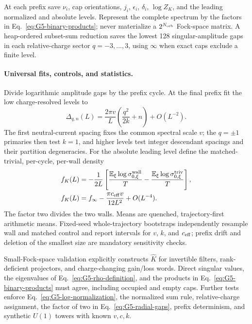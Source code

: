\documentclass[aps,prx,twocolumn,floatfix,nofootinbib,superscriptaddress,longbibliography]{revtex4-2}
\newcommand{\E}{\mathbb{E}}
\begin{document}
At each prefix save $\nu_i$, cap orientations, $j_i$, $\epsilon_i$, $\delta_i$,
$\log Z_K$, and the leading normalized and absolute levels.  Represent the complete
spectrum by the factors in Eq.~\eqref{eq:G5-binary-products}; never materialize a
$2^{N_{\rm orb}}$ Fock-space matrix.  A heap-ordered subset-sum reduction saves the lowest
128 singular-amplitude gaps in each relative-charge sector $q=-3,\ldots,3$, using
$\infty$ when exact caps exclude a finite level.

\paragraph*{Universal fits, controls, and statistics.}
Divide logarithmic amplitude gaps by the prefix cycle.  At the final prefix fit the
low charge-resolved levels to
\begin{equation}
 \Delta_{q,n}(L)=\frac{2\pi v}{L}
 \left(\frac{q^2}{2k}+n\right)+O(L^{-2}).
 \label{eq:G5-conformal-tower}
\end{equation}
The first neutral-current spacing fixes the common spectral scale $v$; the $q=\pm1$
primaries then test $k=1$, and higher levels test integer descendant spacings and their
partition degeneracies.  For the absolute leading level define the matched-trivial,
per-cycle, per-wall density
\begin{equation}
 \begin{aligned}
 f_K(L)&=-\frac{1}{2L}\left[
 \frac{\E_\xi\log\sigma_{0,\xi}^{\rm wall}}{T}
 -\frac{\E_\xi\log\sigma_{0,\xi}^{\rm triv}}{T}\right],\\
 f_K(L)&=f_\infty-\frac{\pi c_{\rm eff}v}{12L^2}+O(L^{-4}).
 \end{aligned}
 \label{eq:G5-casimir-fit}
\end{equation}
The factor two divides the two walls.  Means are quenched, trajectory-first arithmetic
means.  Fixed-seed whole-trajectory bootstraps independently resample wall and matched
control and report intervals for $v$, $k$, and $c_{\rm eff}$; prefix drift and deletion of
the smallest size are mandatory sensitivity checks.

Small-Fock-space validation explicitly constructs $\widehat K$ for invertible filters,
rank-deficient projectors, and charge-changing gain/loss words.  Direct singular values,
the eigenvalues of Eq.~\eqref{eq:G5-rho-definition}, and the products in
Eq.~\eqref{eq:G5-binary-products} must agree, including occupied and empty caps.  Further
tests enforce Eq.~\eqref{eq:G5-log-normalization}, the normalized sum rule, relative-charge
assignment, the factor of two in Eq.~\eqref{eq:G5-radial-gaps}, prefix determinism, and
synthetic $U(1)$ towers with known $v,c,k$.
\end{document}
